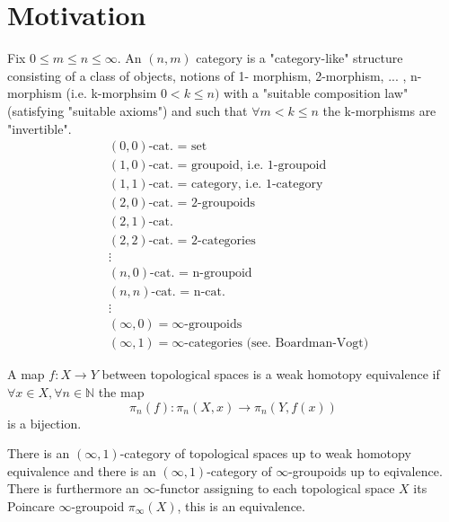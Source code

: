 \section{Motivation}

Fix $ 0 \leq m \leq n \leq \infty $. 
An $ ( n , m ) $ category is a "category-like" structure consisting of a class of objects, notions of 1- morphism, 2-morphism, ... , n-morphism (i.e. k-morphsim $ 0 < k \leq n )$ with a "suitable composition law" (satisfying "suitable axioms") and such that $ \forall m < k \leq n $ the k-morphisms are "invertible".
\begin{align*}
    &( 0 , 0 ) \text{-cat. = set}
    \\
    &( 1 , 0 ) \text{-cat. = groupoid, i.e. 1-groupoid}
    \\
    &( 1 , 1 ) \text{-cat. = category, i.e. 1-category}
    \\
    &( 2 , 0 ) \text{-cat. = 2-groupoids}
    \\
    &( 2 , 1 ) \text{-cat.}
    \\
    &( 2 , 2 ) \text{-cat. = 2-categories}
    \\
    &\vdots
    \\
    &( n , 0 ) \text{-cat. = n-groupoid}
    \\
    &( n , n ) \text{-cat. = n-cat.}
    \\
    &\vdots
    \\
    &( \infty , 0 ) = \infty \text{-groupoids}
    \\
    &( \infty , 1 ) = \infty \text{-categories (see. Boardman-Vogt)}
\end{align*}

\begin{rmd}
    A map $ f \colon X \to Y $ between topological spaces is a weak homotopy equivalence if $ \forall x \in X, \forall n \in \mathbb{ N } $ the map
    \[
        \pi_n ( f ) \colon \pi_n ( X , x ) \xrightarrow{} \pi_n ( Y , f ( x ) ) 
    \]
    is a bijection.
\end{rmd}

\begin{thm}
     There is an $ ( \infty , 1 ) $-category of topological spaces up to weak  homotopy equivalence and there is an $ ( \infty , 1 ) $-category of $ \infty $-groupoids up to eqivalence.
    There is furthermore an $ \infty $-functor assigning to each topological space $ X $ its Poincare $ \infty $-groupoid $ \pi_{ \infty } ( X ) $, this is an equivalence.
\end{thm}

